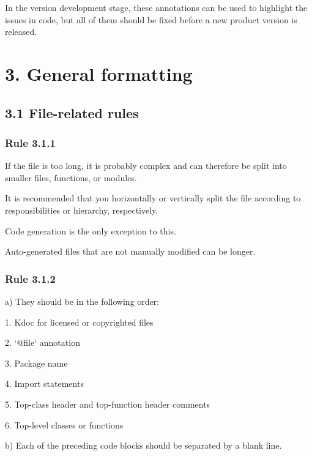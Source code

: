 In the version development stage, these annotations can be used to highlight the issues in code, but all of them should be fixed before a new product version is released.

\section*{\textbf{3. General formatting}}

\subsection*{\textbf{3.1 File-related rules}}

\subsubsection*{\textbf{Rule 3.1.1}}
\leavevmode\newline



If the file is too long, it is probably complex and can therefore be split into smaller files, functions, or modules.

It is recommended that you horizontally or vertically split the file according to responsibilities or hierarchy, respectively.

Code generation is the only exception to this.

Auto-generated files that are not manually modified can be longer.



\subsubsection*{\textbf{Rule 3.1.2}}
\leavevmode\newline



a) They should be in the following order:

1.	Kdoc for licensed or copyrighted files

2.	`@file` annotation

3.	Package name

4.	Import statements

5.	Top-class header and top-function header comments

6.	Top-level classes or functions



b) Each of the preceding code blocks should be separated by a blank line.



